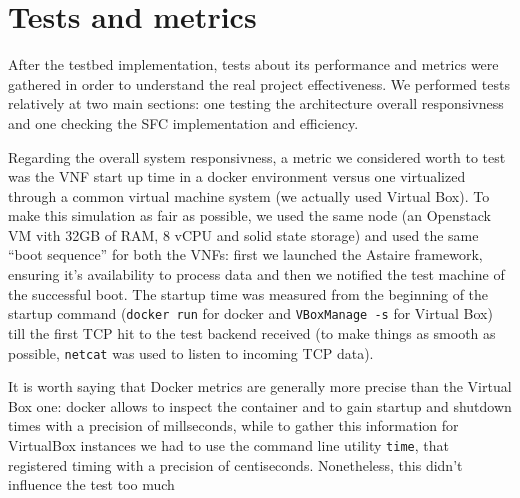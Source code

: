 \chapter{Tests and metrics}

After the testbed implementation, tests about its performance and metrics were 
gathered in order to understand the real project effectiveness. We performed 
tests relatively at two main sections: one testing the architecture 
overall responsivness and one checking the SFC implementation and efficiency.

Regarding the overall system responsivness, a metric we considered worth to 
test was the VNF start up time in a docker environment versus one virtualized 
through a common virtual machine system (we actually used Virtual Box). To 
make this simulation as fair as possible, we used the same node (an Openstack 
VM vith 32GB of RAM, 8 vCPU and solid state storage) and used the same ``boot 
sequence'' for both the VNFs: first we launched the Astaire framework, 
ensuring it's availability to process data and then we notified the test 
machine of the successful boot. The startup time was measured from the 
beginning of the startup command (\verb!docker run! for docker and 
\verb!VBoxManage -s! for Virtual Box) till the first TCP hit to the test 
backend received (to make things as smooth as possible, \verb!netcat! was used 
to listen to incoming TCP data).

It is worth saying that Docker metrics are generally more precise than the 
Virtual Box one: docker allows to inspect the container and to gain startup and 
shutdown times with a precision of millseconds, while to gather this 
information for VirtualBox instances we had to use the command line utility 
\verb!time!, that registered timing with a precision of centiseconds. Nonetheless, this didn't influence the test too 
much %
